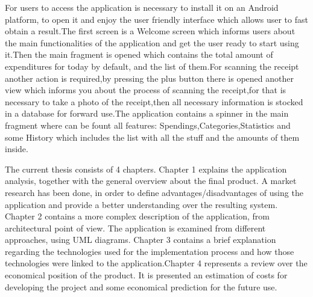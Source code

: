 For users to access the application is necessary to install it on an Android platform, to open it and enjoy the user friendly interface which allows user to fast obtain a result.The first screen is a Welcome screen which informs users about the main functionalities of the application and get the user ready to start using it.Then the main fragment is opened which contains the total amount of expenditures for today by default, and the list of them.For scanning the receipt another action is required,by pressing the plus button there is opened another view which informs you about the process of scanning the receipt,for that is necessary to take a photo of the receipt,then all necessary information is stocked in a database for forward use.The application contains a spinner in the main fragment where can be fount all features: Spendings,Categories,Statistics and some History which includes the list with all the stuff and the amounts of them inside. 

The current thesis consists of 4 chapters. Chapter 1 explains the application analysis, together with the general overview about the final product. A market research has been done, in order to define advantages/disadvantages of using the application and provide a better understanding over the resulting system. Chapter 2 contains a more complex description of the application, from architectural point of view. The application is examined from different approaches, using UML diagrams. Chapter 3 contains a brief explanation regarding the technologies used for the implementation process and how those technologies were linked to the application.Chapter 4 represents a review over the economical position of the product. It is presented an estimation of costs for developing the project and some economical prediction for the future use.
